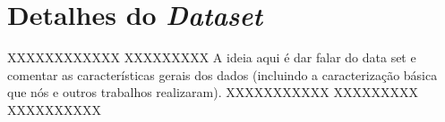 \section{Detalhes do \textit{Dataset}}\label{modelagem}

XXXXXXXXXXXX XXXXXXXXX A ideia aqui é dar falar do data set e comentar
as características gerais dos dados (incluindo a caracterização básica
que nós e outros trabalhos realizaram). XXXXXXXXXXX XXXXXXXXX XXXXXXXXXX
